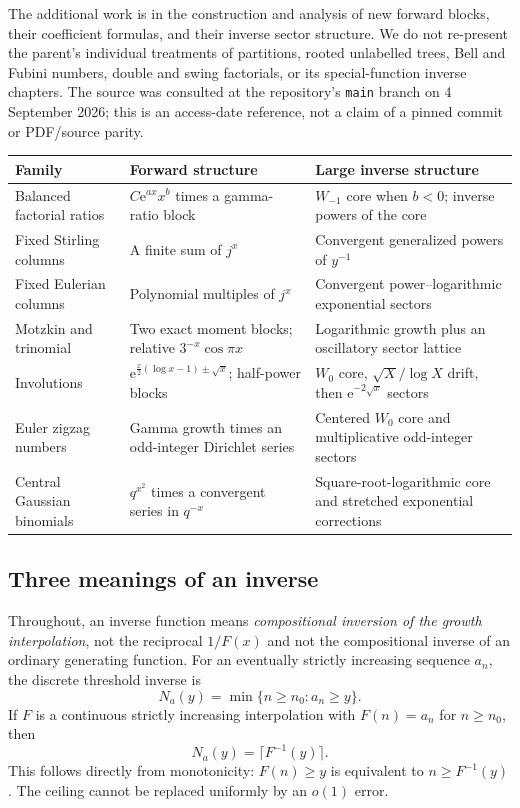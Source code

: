 \documentclass[11pt,a4paper]{article}
\theoremstyle{definition}
\theoremstyle{remark}
\newcommand{\ee}{\mathrm e}
\numberwithin{equation}{section}
\begin{document}
The additional work is in the construction and analysis of new forward blocks, their coefficient formulas, and their inverse sector structure. We do not re-present the parent's individual treatments of partitions, rooted unlabelled trees, Bell and Fubini numbers, double and swing factorials, or its special-function inverse chapters. The source was consulted at the repository's \texttt{main} branch on 4 September 2026; this is an access-date reference, not a claim of a pinned commit or PDF/source parity.

\begin{center}
\small
\begin{tabularx}{\textwidth}{@{}>{\raggedright\arraybackslash}p{}>{\raggedright\arraybackslash}X>{\raggedright\arraybackslash}X@{}}
\toprule
Family & Forward structure & Large inverse structure\\
\midrule
Balanced factorial ratios & $C\ee^{ax}x^b$ times a gamma-ratio block & $W_{-1}$ core when $b<0$; inverse powers of the core\\
Fixed Stirling columns & A finite sum of $j^x$ & Convergent generalized powers of $y^{-1}$\\
Fixed Eulerian columns & Polynomial multiples of $j^x$ & Convergent power--logarithmic exponential sectors\\
Motzkin and trinomial & Two exact moment blocks; relative $3^{-x}\cos\pi x$ & Logarithmic growth plus an oscillatory sector lattice\\
Involutions & $\ee^{\frac x2(\log x-1)\pm\sqrt x}$; half-power blocks & $W_0$ core, $\sqrt X/\log X$ drift, then $\ee^{-2\sqrt x}$ sectors\\
Euler zigzag numbers & Gamma growth times an odd-integer Dirichlet series & Centered $W_0$ core and multiplicative odd-integer sectors\\
Central Gaussian binomials & $q^{x^2}$ times a convergent series in $q^{-x}$ & Square-root-logarithmic core and stretched exponential corrections\\
\bottomrule
\end{tabularx}
\end{center}

\subsection{Three meanings of an inverse}
Throughout, an inverse function means \emph{compositional inversion of the growth interpolation}, not the reciprocal $1/F(x)$ and not the compositional inverse of an ordinary generating function. For an eventually strictly increasing sequence $a_n$, the discrete threshold inverse is
\begin{equation}
 N_a(y)=\min\{n\ge n_0:a_n\ge y\}.
 \label{eq:threshold}
\end{equation}
If $F$ is a continuous strictly increasing interpolation with $F(n)=a_n$ for $n\ge n_0$, then
\begin{equation}
 N_a(y)=\lceil F^{-1}(y)\rceil.
 \label{eq:ceiling}
\end{equation}
This follows directly from monotonicity: $F(n)\ge y$ is equivalent to $n\ge F^{-1}(y)$. The ceiling cannot be replaced uniformly by an $o(1)$ error.
\end{document}

